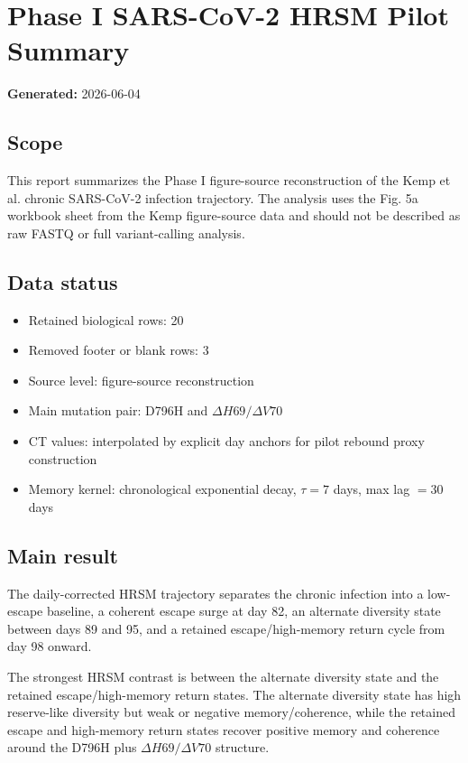 \section*{Phase I SARS-CoV-2 HRSM Pilot Summary}

\textbf{Generated:} 2026-06-04

\subsection*{Scope}
This report summarizes the Phase I figure-source reconstruction of the Kemp et al. chronic SARS-CoV-2 infection trajectory. The analysis uses the Fig. 5a workbook sheet from the Kemp figure-source data and should not be described as raw FASTQ or full variant-calling analysis.

\subsection*{Data status}
\begin{itemize}
\item Retained biological rows: 20
\item Removed footer or blank rows: 3
\item Source level: figure-source reconstruction
\item Main mutation pair: D796H and \(\Delta H69/\Delta V70\)
\item CT values: interpolated by explicit day anchors for pilot rebound proxy construction
\item Memory kernel: chronological exponential decay, \(\tau=7\) days, max lag \(=30\) days
\end{itemize}

\subsection*{Main result}
The daily-corrected HRSM trajectory separates the chronic infection into a low-escape baseline, a coherent escape surge at day 82, an alternate diversity state between days 89 and 95, and a retained escape/high-memory return cycle from day 98 onward.

The strongest HRSM contrast is between the alternate diversity state and the retained escape/high-memory return states. The alternate diversity state has high reserve-like diversity but weak or negative memory/coherence, while the retained escape and high-memory return states recover positive memory and coherence around the D796H plus \(\Delta H69/\Delta V70\) structure.

